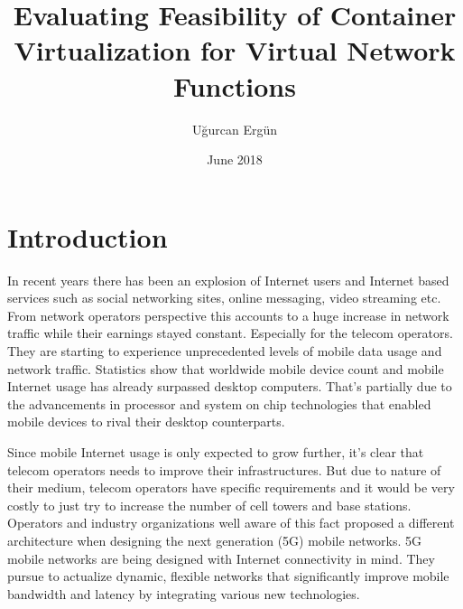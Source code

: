 \documentclass[12pt,oneandhalf,chaparabic,ceng,ms,eng,oneside,pntc]{gsufbe}
\author{Uğurcan Ergün}
\title{Evaluating Feasibility of Container Virtualization for Virtual Network Functions}
\date{June 2018}
\begin{document}
\addtolength{\textheight}{1.5cm}
\newlength\myindent
\setlength\myindent{6em}
\newcommand\bindent{%
  \begingroup
  \setlength{\itemindent}{\myindent}
  \addtolength{\algorithmicindent}{\myindent}
}
\newcommand\eindent{\endgroup}
\begin{preliminaries}

\end{preliminaries}
%
%
%
\newtheorem{thm}{Definition}[chapter]
\renewcommand{\thethm}{\arabic{chapter}.\arabic{thm}}
\newtheorem{prp}{Proposition}[chapter]
\renewcommand{\theprp}{\arabic{chapter}.\arabic{prp}}
\newenvironment{prf}{\noindent{\bf Proof}}{$\hfill \Box$ \vspace{10pt}}

\chapter{Introduction}
In recent years there has been an explosion of Internet users and Internet based services such as
social networking sites, online messaging, video streaming etc. From network operators perspective this
accounts to a huge increase in network traffic while their earnings stayed constant. Especially for the
telecom operators. They are starting to experience unprecedented levels of mobile data usage and
network traffic. Statistics show that worldwide mobile device count and mobile Internet usage has 
already surpassed desktop computers. That's partially due to the advancements in processor and system
on chip technologies that enabled mobile devices to rival their desktop counterparts. 

Since mobile Internet usage is only expected to grow further, it's clear that telecom operators needs
to improve their infrastructures. But due to nature of their medium, telecom operators have specific
requirements and it would be very costly to just try to increase the number of cell towers and base
stations. Operators and industry organizations well aware of this fact proposed a different
architecture when designing the next generation (5G) mobile networks. 5G mobile networks are being
designed with Internet connectivity in mind. They pursue to actualize dynamic, flexible networks that
significantly improve mobile bandwidth and latency by integrating various new technologies.
\end{document}

